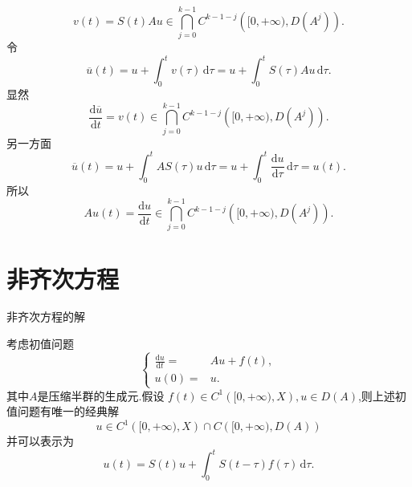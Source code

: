 \begin{frame}[t]
  \begin{equation}
    {v}(t)=S(t)Au \in \bigcap_{j=0} ^{k-1}C^{k-1-j}\left( [0,+\infty),D(A^{j}) \right) .
  \end{equation}
 令
  \begin{equation}
    \overline{u}(t)=u+\int_0^{t}v(\tau )\,\mathrm{d}\tau =u+\int_0^{t}S(\tau )Au\,\mathrm{d}\tau .
 \end{equation}
 显然
 \begin{equation}
   \frac{\mathrm{d} \overline{u}}{\mathrm{d}t}=v(t) \in  \bigcap_{j=0} ^{k-1}C^{k-1-j}\left( [0,+\infty),D(A^{j}) \right) .
 \end{equation}
 另一方面
\begin{equation}
  \overline{u}(t)=u+\int_0^{t}AS(\tau )u\,\mathrm{d}\tau =u+\int_0^{t}\frac{\mathrm{d}u}{\mathrm{d}\tau }\,\mathrm{d}\tau =u(t).
\end{equation}
所以
\begin{equation}
  Au(t)=\frac{\mathrm{d}u}{\mathrm{d}t} \in  \bigcap_{j=0} ^{k-1}C^{k-1-j}\left( [0,+\infty),D(A^{j}) \right) .	 
\end{equation}

\end{frame}

\section{非齐次方程}

\begin{frame}[t]{非齐次方程的解}
  \begin{theorem}
    考虑初值问题
    \begin{equation}
      \left\{
	\begin{aligned}
	  \frac{\mathrm{d}u}{\mathrm{d}t}=&Au+f(t),\\
	  u(0)=&u.
	\end{aligned}
	\right.
    \end{equation}
    其中$A$是压缩半群的生成元.假设 $f(t)\in C^{1}\left( [0,+\infty),X \right) ,u\in D(A)$,则上述初值问题有唯一的经典解
    \[
      u\in C^{1}\left( [0,+\infty),X \right) \cap C\left( [0,+\infty),D(A) \right)  
    \] 
    并可以表示为
    \begin{equation}\label{41}
      u(t)=S(t)u+\int_0^{t}S(t-\tau )f(\tau )\,\mathrm{d}\tau .
    \end{equation}
  \end{theorem}
\end{frame}


